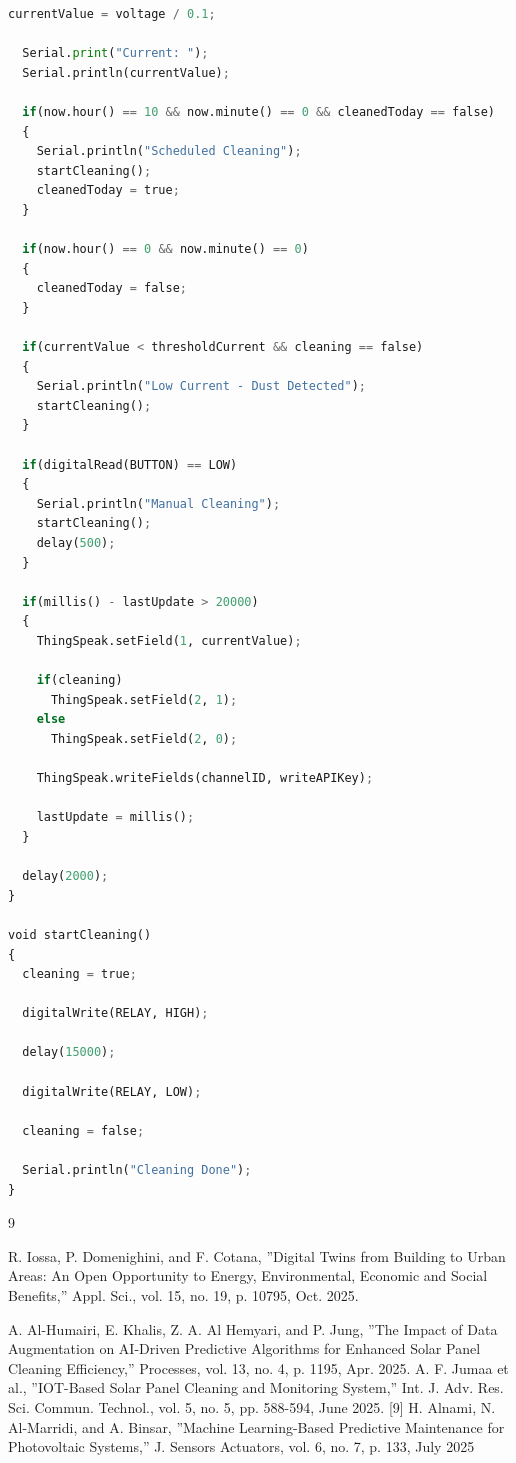 \documentclass[10pt]{report}
\begin{document}
\begin{sloppypar}
{{{\begin{sloppypar}
\begin{lstlisting}[language=python]
  currentValue = voltage / 0.1;

  Serial.print("Current: ");
  Serial.println(currentValue);

  if(now.hour() == 10 && now.minute() == 0 && cleanedToday == false)
  {
    Serial.println("Scheduled Cleaning");
    startCleaning();
    cleanedToday = true;
  }

  if(now.hour() == 0 && now.minute() == 0)
  {
    cleanedToday = false;
  }

  if(currentValue < thresholdCurrent && cleaning == false)
  {
    Serial.println("Low Current - Dust Detected");
    startCleaning();
  }

  if(digitalRead(BUTTON) == LOW)
  {
    Serial.println("Manual Cleaning");
    startCleaning();
    delay(500);
  }

  if(millis() - lastUpdate > 20000)
  {
    ThingSpeak.setField(1, currentValue);

    if(cleaning)
      ThingSpeak.setField(2, 1);
    else
      ThingSpeak.setField(2, 0);

    ThingSpeak.writeFields(channelID, writeAPIKey);

    lastUpdate = millis();
  }

  delay(2000);
}

void startCleaning()
{
  cleaning = true;

  digitalWrite(RELAY, HIGH);

  delay(15000);

  digitalWrite(RELAY, LOW);

  cleaning = false;

  Serial.println("Cleaning Done");
}

\end{lstlisting}


\renewcommand\bibname{References}


\begin{thebibliography}{9}





  R. Iossa, P. Domenighini, and F. Cotana, ”Digital Twins from Building to Urban
Areas: An Open Opportunity to Energy, Environmental, Economic and Social
Benefits,” Appl. Sci., vol. 15, no. 19, p. 10795, Oct. 2025.

  A. Al-Humairi, E. Khalis, Z. A. Al Hemyari, and P. Jung, ”The Impact of Data
Augmentation on AI-Driven Predictive Algorithms for Enhanced Solar Panel
Cleaning Efficiency,” Processes, vol. 13, no. 4, p. 1195, Apr. 2025.
  A. F. Jumaa et al., ”IOT-Based Solar Panel Cleaning and Monitoring System,”
Int. J. Adv. Res. Sci. Commun. Technol., vol. 5, no. 5, pp. 588-594, June 2025.
[9] H. Alnami, N. Al-Marridi, and A. Binsar, ”Machine Learning-Based Predictive
Maintenance for Photovoltaic Systems,” J. Sensors Actuators, vol. 6, no. 7, p.
133, July 2025


\end{thebibliography}
\end{sloppypar}}}}
\end{sloppypar}
\end{document}
